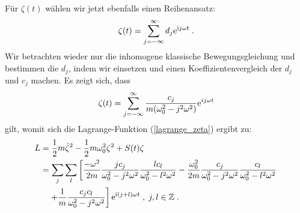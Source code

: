       Für $\zeta(t)$ wählen wir jetzt ebenfalls einen Reihenansatz:
      \begin{equation}
        \zeta(t) = \sum_{j=-\infty}^\infty d_j \text e^{\text ij\omega t} \; .
      \end{equation}
      Wir betrachten wieder nur die inhomogene klassische Bewegungsgleichung und bestimmen die $d_j$, indem wir einsetzen und einen Koeffizientenvergleich der $d_j$ und $c_j$ machen.
      Es zeigt sich, dass
      \begin{equation}
        \zeta(t) = \sum_{j=-\infty}^\infty \frac{c_j}{m(\omega_0^2-j^2\omega^2)} \text e^{ij\omega t}
        \label{zeta_bel_kraft}
      \end{equation}
      gilt, womit sich die Lagrange-Funktion (\ref{lagrange_zeta}) ergibt zu:
      \begin{align}
        \begin{split}
          L &= \frac{1}{2}m\dot \zeta^2 - \frac{1}{2}m\omega_0^2\zeta^2 + S(t)\zeta \notag\\
           &=\sum_j \sum_l \left[ \frac{-\omega^2}{2m} \frac{jc_j}{\omega_0^2-j^2\omega^2} \frac{lc_l}{\omega_0^2-l^2\omega^2}
           -\frac{\omega_0^2}{2m} \frac{c_j}{\omega_0^2-j^2\omega^2} \frac{c_l}{\omega_0^2-l^2\omega^2} \right. \notag\\
            &\left. \quad + \frac{1}{m} \frac{c_jc_l}{\omega_0^2-j^2\omega^2} \right] \text e^{\text i(j+l)\omega t}  \; , \; j,l \in \mathbb{Z} \; .
         \end{split}
       \end{align}
      \iffalse
      \begin{align}
        \begin{split}
          L &= \frac{1}{2}m\dot \zeta^2 - \frac{1}{2}m\omega_0^2\zeta^2 + S(t)\zeta \\
           &=\frac{-\omega^2}{2m} \sum_j \sum_l \frac{jc_j}{\omega_0^2-j^2\omega^2} \frac{lc_l}{\omega_0^2-l^2\omega^2} \text e^{\text i(j+l)\omega t}\\
           &\quad-\frac{\omega_0^2}{2m} \sum_j \sum_l \frac{c_j}{\omega_0^2-j^2\omega^2} \frac{c_l}{\omega_0^2-l^2\omega^2} \text e^{\text i(j+l)\omega t}\\
           &\quad + \frac{1}{m} \sum_j \sum_l \frac{c_jc_l}{\omega_0^2-j^2\omega^2} \text e^{\text i(j+l)\omega t}\; , \; j,l \in \mathbb{Z} \; .
         \end{split}
       \end{align}
       \fi

